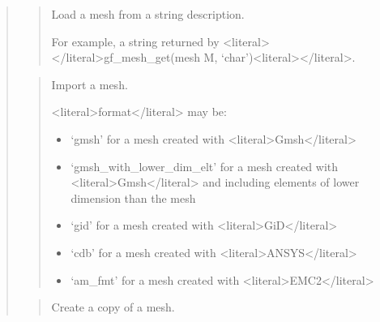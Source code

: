 \documentclass[a4paper,11pt,english]{sphinxmanual}
\begin{document}
\begin{quote}
\sphinxAtStartPar
{}
\begin{quote}

\sphinxAtStartPar
Load a mesh from a string description.

\sphinxAtStartPar
For example, a string returned by \textless{}literal\textgreater{}\textless{}/literal\textgreater{}gf\_mesh\_get(mesh M, ‘char’)\textless{}literal\textgreater{}\textless{}/literal\textgreater{}.
\end{quote}

\sphinxAtStartPar
{}
\begin{quote}

\sphinxAtStartPar
Import a mesh.

\sphinxAtStartPar
\textless{}literal\textgreater{}format\textless{}/literal\textgreater{} may be:
\begin{itemize}
\item {} 
\sphinxAtStartPar
‘gmsh’ for a mesh created with \textless{}literal\textgreater{}Gmsh\textless{}/literal\textgreater{}

\item {} 
\sphinxAtStartPar
‘gmsh\_with\_lower\_dim\_elt’ for a mesh created with \textless{}literal\textgreater{}Gmsh\textless{}/literal\textgreater{} and including elements of lower dimension than the mesh

\item {} 
\sphinxAtStartPar
‘gid’ for a mesh created with \textless{}literal\textgreater{}GiD\textless{}/literal\textgreater{}

\item {} 
\sphinxAtStartPar
‘cdb’ for a mesh created with \textless{}literal\textgreater{}ANSYS\textless{}/literal\textgreater{}

\item {} 
\sphinxAtStartPar
‘am\_fmt’ for a mesh created with \textless{}literal\textgreater{}EMC2\textless{}/literal\textgreater{}

\end{itemize}
\end{quote}

\sphinxAtStartPar
{}
\begin{quote}

\sphinxAtStartPar
Create a copy of a mesh.
\end{quote}


\end{quote}
\end{document}
